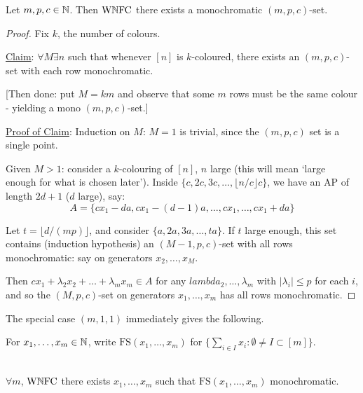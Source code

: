 \documentclass[10pt]{article}
\newcommand{\wnfc}{\textrm{W}\N\textrm{FC}}
\newcommand{\fs}{\textrm{FS}}
\begin{document}
\begin{theorem}
    Let $m,p,c\in\mathbb{N}$. Then $\wnfc$ there exists a monochromatic $(m,p,c)$-set.
\end{theorem}
\begin{proof}
    Fix $k$, the number of colours.

    \underline{Claim}: $\forall M\exists n$ such that whenever $[n]$ is $k$-coloured, there exists an $(m,p,c)$-set with each row monochromatic.

    [Then done: put $M = km$ and observe that some $m$ rows must be the same colour - yielding a mono $(m,p,c)$-set.]

    \underline{Proof of Claim}: Induction on $M$: $M = 1$ is trivial, since the $(m,p,c)$ set is a single point.

    Given $M > 1$: consider a $k$-colouring of $[n]$, $n$ large (this will mean `large enough for what is chosen later'). Inside $\{c,2c,3c,\dots,\lfloor n/c \rfloor c\}$, we have an AP of length $2d+1$ ($d$ large), say: $$A = \{cx_1 - da, cx_1 - (d-1)a,\dots,cx_1,\dots,cx_1+da\}$$

    Let $t = \lfloor d/(mp)\rfloor$, and consider $\{a,2a,3a,\dots,ta\}$. If $t$ large enough, this set contains (induction hypothesis) an $(M-1,p,c)$-set with all rows monochromatic: say on generators $x_2,\dots,x_M$.

    Then $cx_1 + \lambda_2x_2 + \dots + \lambda_m x_m\in A$ for any $lambda_2,\dots,\lambda_m$ with $|\lambda_i|\le p$ for each $i$, and so the $(M,p,c)$-set on generators $x_1,\dots,x_m$ has all rows monochromatic.
\end{proof}

The special case $(m,1,1)$ immediately gives the following.

For $x_1,\dots,x_m \in \mathbb{N}$, write $\fs(x_1,\dots,x_m)$ for $\{\sum_{i\in I}x_i:\emptyset\ne I\subset [m]\}$.

\begin{cor}\ \\
    $\forall m$, $\wnfc$ there exists $x_1,\dots,x_m$ such that $\fs(x_1,\dots,x_m)$ monochromatic. \qedsymbol
\end{cor}
\end{document}
